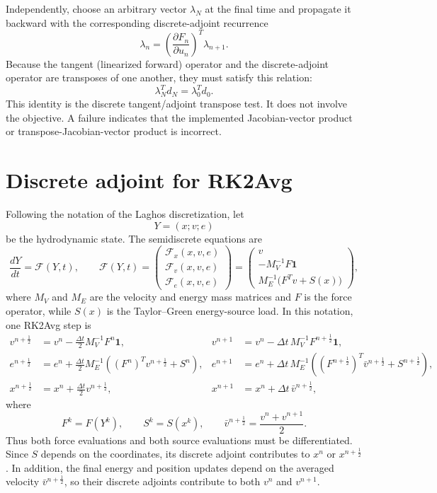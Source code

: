 \documentclass[11pt]{article}
\begin{document}
Independently, choose an arbitrary vector $\lambda_N$ at the final time
and propagate it backward with the corresponding discrete-adjoint recurrence
\[
 \lambda_n=
 \left(\frac{\partial F_n}{\partial u_n}\right)^T\lambda_{n+1}.
\]
Because the tangent (linearized forward) operator and the discrete-adjoint operator
are transposes of one another,
they must satisfy this relation:
\[
  \boxed{\lambda_N^T d_N=\lambda_0^T d_0.}
\]
This identity is the discrete tangent/adjoint transpose test.
It does not involve the objective.
A failure indicates that the implemented Jacobian-vector product or
transpose-Jacobian-vector product is incorrect.

\section{Discrete adjoint for RK2Avg}

Following the notation of the Laghos discretization, let
\[
 Y=(x;v;e)
\]
be the hydrodynamic state.  The semidiscrete equations are
\[
 \frac{dY}{dt}=\mathcal F(Y,t),
 \qquad
 \mathcal F(Y,t)=
 \begin{pmatrix}
  \mathcal F_x(x,v,e)\\
  \mathcal F_v(x,v,e)\\
  \mathcal F_e(x,v,e)
 \end{pmatrix}
 =
 \begin{pmatrix}
  v\\
  -M_V^{-1}F\mathbf 1\\
  M_E^{-1}\bigl(F^Tv+S(x)\bigr)
 \end{pmatrix},
\]
where $M_V$ and $M_E$ are the velocity and energy mass matrices and $F$ is
the force operator, while $S(x)$ is the Taylor--Green energy-source load.
In this notation, one RK2Avg step is
\begin{align}
 v^{n+\frac12}
 &=v^n-\frac{\Delta t}{2}M_V^{-1}F^n\mathbf 1,
 &
 v^{n+1}
 &=v^n-\Delta t\,M_V^{-1}F^{n+\frac12}\mathbf 1,
 \\
 e^{n+\frac12}
 &=e^n+\frac{\Delta t}{2}M_E^{-1}
 \left((F^n)^Tv^{n+\frac12}+S^n\right),
 &
 e^{n+1}
 &=e^n+\Delta t\,M_E^{-1}
 \left((F^{n+\frac12})^T\bar v^{n+\frac12}+S^{n+\frac12}\right),
 \\
 x^{n+\frac12}
 &=x^n+\frac{\Delta t}{2}v^{n+\frac12},
 &
 x^{n+1}
 &=x^n+\Delta t\,\bar v^{n+\frac12},
\end{align}
where
\[
 F^k=F(Y^k),
 \qquad
 S^k=S(x^k),
 \qquad
 \bar v^{n+\frac12}=\frac{v^n+v^{n+1}}{2}.
\]
Thus both force evaluations and both source evaluations must be
differentiated.  Since $S$ depends on the coordinates, its discrete adjoint
contributes to $x^n$ or $x^{n+\frac12}$.  In addition, the final energy and
position updates depend on the averaged velocity $\bar v^{n+\frac12}$, so their
discrete adjoints contribute to both $v^n$ and $v^{n+1}$.
\end{document}
